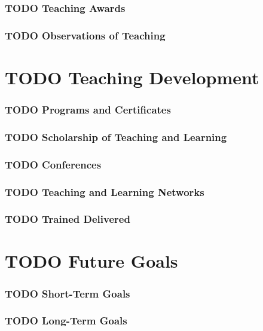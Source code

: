 \documentclass[12pt]{report}
\begin{document}
\section{{\bfseries\sffamily TODO} Teaching Awards}
\label{sec:org5605521}
\section{{\bfseries\sffamily TODO} Observations of Teaching}
\label{sec:org769d12c}
\part{{\bfseries\sffamily TODO} Teaching Development}
\label{sec:orga6a7b41}
\section{{\bfseries\sffamily TODO} Programs and Certificates}
\label{sec:orgca37a7c}
\section{{\bfseries\sffamily TODO} Scholarship of Teaching and Learning}
\label{sec:orgb7591e4}
\section{{\bfseries\sffamily TODO} Conferences}
\label{sec:org274defa}
\section{{\bfseries\sffamily TODO} Teaching and Learning Networks}
\label{sec:org4266441}
\section{{\bfseries\sffamily TODO} Trained Delivered}
\label{sec:orgeabc00c}
\part{{\bfseries\sffamily TODO} Future Goals}
\label{sec:orgf301c28}
\section{{\bfseries\sffamily TODO} Short-Term Goals}
\label{sec:orgb08f3e6}
\section{{\bfseries\sffamily TODO} Long-Term Goals}
\label{sec:orgc62b64b}
\end{document}
